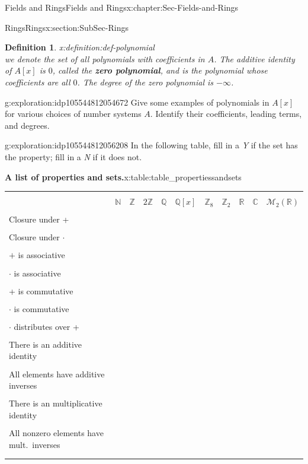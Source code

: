 \documentclass[oneside,10pt,]{book}
\newcommand{\tabularfont}{\relax}
\newcommand{\terminology}[1]{\textbf{#1}}
\numberwithin{equation}{section}
\newcommand{\hrulethin}  {\noalign{\hrule height 0.04em}}
\def\C{{\mathbb C}}
\def\Z{{\mathbb Z}}
\def\Q{{\mathbb Q}}
\def\N{{\mathbb N}}
\def\R{{\mathbb R}}
\newtheorem{definition}[theorem]{Definition}
\begin{document}
\begin{chapterptx}{Fields and Rings}{}{Fields and Rings}{}{}{x:chapter:Sec-Fields-and-Rings}
\begin{sectionptx}{Rings}{}{Rings}{}{}{x:section:SubSec-Rings}
\begin{definition}{}{x:definition:def-polynomial}
\begin{equation*}
\end{equation*}
we denote the set of all polynomials with coefficients in \(A\). The additive identity of \(A[x]\) is \(0\), called the \terminology{zero polynomial}, and is the polynomial whose coefficients are all \(0\). The degree of the zero polynomial is \(-\infty\).%
\end{definition}
\begin{exploration}{}{g:exploration:idp105544812054672}%
Give some examples of polynomials in \(A[x]\) for various choices of number systems \(A\). Identify their coefficients, leading terms, and degrees.%
\end{exploration}%
\begin{exploration}{}{g:exploration:idp105544812056208}%
In the following table, fill in a \emph{Y} if the set has the property; fill in a \emph{N} if it does not.%
\begin{tableptx}{\textbf{A list of properties and sets.}}{x:table:table_propertiessandsets}{}%
\centering%
{\tabularfont%
\begin{tabular}{lllllllllll}
&&&&&&&&&&\tabularnewline\hrulethin
&\(\N\)&\(\Z\)&\(2\Z\)&\(\Q\)&\(\Q[x]\)&\(\Z_{8}\)&\(\Z_{2}\)&\(\R\)&\(\C\)&\(\mathcal{M}_2(\R)\)\tabularnewline[0pt]
&&&&&&&&&&\tabularnewline\hrulethin
Closure under +&&&&&&&&&&\tabularnewline[0pt]
&&&&&&&&&&\tabularnewline\hrulethin
Closure under \(\cdot\)&&&&&&&&&&\tabularnewline[0pt]
&&&&&&&&&&\tabularnewline\hrulethin
\(+\) is associative&&&&&&&&&&\tabularnewline[0pt]
&&&&&&&&&&\tabularnewline\hrulethin
\(\cdot\) is associative&&&&&&&&&&\tabularnewline[0pt]
&&&&&&&&&&\tabularnewline\hrulethin
+ is commutative&&&&&&&&&&\tabularnewline[0pt]
&&&&&&&&&&\tabularnewline\hrulethin
\(\cdot\) is commutative&&&&&&&&&&\tabularnewline[0pt]
&&&&&&&&&&\tabularnewline\hrulethin
\(\cdot\) distributes over +&&&&&&&&&&\tabularnewline[0pt]
&&&&&&&&&&\tabularnewline\hrulethin
There is an additive identity&&&&&&&&&&\tabularnewline[0pt]
&&&&&&&&&&\tabularnewline\hrulethin
All elements have additive inverses&&&&&&&&&&\tabularnewline[0pt]
&&&&&&&&&&\tabularnewline\hrulethin
There is an multiplicative identity&&&&&&&&&&\tabularnewline[0pt]
&&&&&&&&&&\tabularnewline\hrulethin
All nonzero elements have mult.~inverses&&&&&&&&&&\tabularnewline[0pt]
&&&&&&&&&&\tabularnewline\hrulethin
\end{tabular}
}%
\end{tableptx}%
\end{exploration}%

\newpage


\end{sectionptx}
\end{chapterptx}
\end{document}
